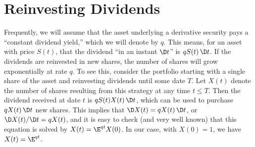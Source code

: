







\section{Reinvesting Dividends}\label{s_reinvestingdividends}

Frequently, we will assume that the asset underlying a derivative security pays a ``constant dividend yield,''  which we will denote by $q$.  This means, for an asset with price $S(t)$, that the dividend ``in an instant $\D t$'' is $q S(t)\,\D t$.  If the dividends are reinvested in new shares, the number of shares will grow exponentially at rate $q$.  To see this, consider the portfolio starting with a single share of the asset and reinvesting dividends until some date $T$.  Let $X(t)$ denote the number of shares resulting from this strategy at any time $t\leq T$.  Then the dividend received at date $t$ is $q S(t)X(t)\,\D t$, which can be used to purchase $q X(t)\,\D t$ new shares.  This implies that $\D X(t)=q X(t)\,\D t$, or $\D X(t)/\D t = q X(t)$, and it is easy to check (and very well known) that this equation is solved by $X(t)=\E^{q t}X(0)$.  In our case, with $X(0)=1$, we have $X(t)=\E^{q t}$.

